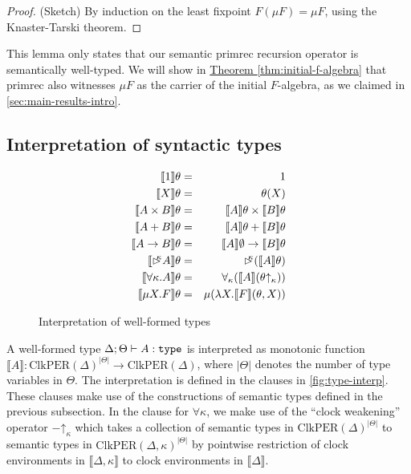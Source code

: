 \documentclass[natbib]{sigplanconf}
\newcommand{\sem}[1]{\llbracket #1 \rrbracket}
\newcommand{\sortType}{\texttt{\textup{type}}}
\newcommand{\delay}[1]{\mathord{\rhd\kern-0.4em^{#1}}}
\newcommand{\ClkPER}{\mathrm{ClkPER}}
\newcommand{\tySem}[1]{\llbracket #1 \rrbracket}
\newcommand{\thmref}[1]{\hyperref[#1]{Theorem \ref*{#1}}}
\begin{document}
\begin{proof}
  (Sketch) By induction on the least fixpoint $F(\mu F) = \mu F$,
  using the Knaster-Tarski theorem.
\end{proof}

This lemma only states that our semantic $\mathrm{primrec}$ recursion
operator is semantically well-typed. We will show in
\thmref{thm:initial-f-algebra} that $\mathrm{primrec}$ also witnesses
$\mu F$ as the carrier of the initial $F$-algebra, as we claimed in
\autoref{sec:main-results-intro}.

\subsection{Interpretation of syntactic types}\label{sec:type-interp}

\begin{figure}[t]
  \centering
  \begin{eqnarray*}
    \tySem{1}\theta & = & 1 \\
    \tySem{X}\theta & = & \theta(X) \\
    \tySem{A \times B}\theta & = & \tySem{A}\theta \times \tySem{B}\theta \\
    \tySem{A + B}\theta & = & \tySem{A}\theta + \tySem{B}\theta \\
    \tySem{A \to B}\theta & = & \tySem{A}\emptyset \to \tySem{B}\theta \\
    \tySem{\delay\kappa A}\theta & = & \delay\kappa (\tySem{A}\theta) \\
    \tySem{\forall \kappa. A}\theta & = & \forall_\kappa (\tySem{A}(\theta\mathord\uparrow_\kappa)) \\
    \tySem{\mu X. F}\theta & = & \mu (\lambda X. \tySem{F}(\theta, X))
  \end{eqnarray*}
  \caption{Interpretation of well-formed types}
  \label{fig:type-interp}
\end{figure}

A well-formed type $\Delta; \Theta \vdash A : \sortType$ is
interpreted as monotonic function $\tySem{A} :
\ClkPER(\Delta)^{|\Theta|} \to \ClkPER(\Delta)$, where $|\Theta|$
denotes the number of type variables in $\Theta$. The interpretation
is defined in the clauses in \autoref{fig:type-interp}. These clauses
make use of the constructions of semantic types defined in the
previous subsection. In the clause for $\forall \kappa$, we make use
of the ``clock weakening'' operator $-\mathord\uparrow_\kappa$ which
takes a collection of semantic types in $\ClkPER(\Delta)^{|\Theta|}$
to semantic types in $\ClkPER(\Delta,\kappa)^{|\Theta|}$ by pointwise
restriction of clock environments in $\sem{\Delta, \kappa}$ to clock
environments in $\sem{\Delta}$.
\end{document}
